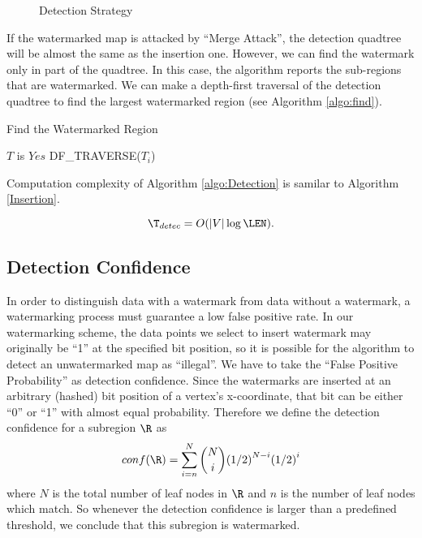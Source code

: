 \begin{figure}[h]
\centering
{}
\caption{Detection Strategy}
\label{fig:detect}
\end{figure} 

If the watermarked map is attacked by ``Merge Attack'', 
the detection quadtree will be almost the same as the insertion one. 
However, we can find the watermark only in part of the quadtree. 
In this case, the algorithm reports the sub-regions that are watermarked.
We can make a depth-first traversal of the detection quadtree to 
find the largest watermarked region (see Algorithm \ref{algo:find}).

\begin{algorithm}[th]
\caption{Find the Watermarked Region}
\label{algo:find}
\begin{algorithmic}[1]
\Statex
{}
\State $T$ is $Yes$
\Else{}
\State DF\_TRAVERSE(${T}_{i}$)
\EndFor
\EndIf\\
\Return
\EndFunction
\Statex
\end{algorithmic}
\end{algorithm}

Computation complexity of Algorithm \ref{algo:Detection} is samilar to Algorithm \ref{Insertion}.
  
\[\T_{detec} = O(|V|\log\LEN).\]

\subsection{Detection Confidence}
In order to distinguish data with a watermark from data without a watermark, 
a watermarking process must guarantee a low false positive rate. 
In our watermarking scheme, the data 
points we select to insert watermark may originally be ``1'' at the specified bit
position, so it is possible for the algorithm to detect an unwatermarked map 
as ``illegal''. We have to take the ``False Positive Probability'' 
as detection confidence. 
Since the watermarks are inserted at an arbitrary (hashed) bit position of
a vertex's x-coordinate, that bit can be either ``0'' or ``1'' with almost
equal probability. Therefore we define the detection confidence for a subregion
$\R$ as
\[
\label{pe}
conf (\R) ={ \sum _{ i=n }^{ N }{{N \choose i} {({ 1 }/{ 2 })}^{ N-i } { ({ 1 }/{ 2 }) }^{ i } }  }
\]
where $N$ is the total number of leaf nodes in $\R$
and $n$ is the number of leaf nodes which match. 
So whenever the detection confidence is larger than a predefined threshold, 
we conclude that this subregion is watermarked.



